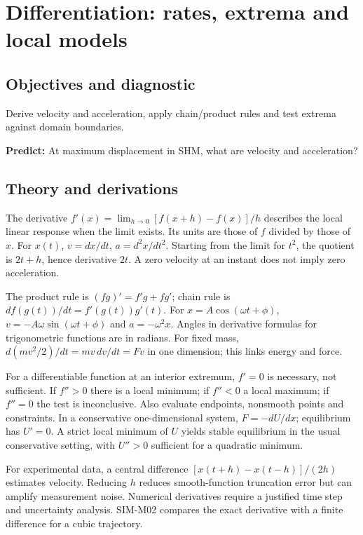 \documentclass[11pt,a4paper,openany]{book}
\begin{document}
\chapter{Differentiation: rates, extrema and local models}
\section{Objectives and diagnostic}
Derive velocity and acceleration, apply chain/product rules and test extrema against domain boundaries.

\textbf{Predict:} At maximum displacement in SHM, what are velocity and acceleration?
\section{Theory and derivations}
The derivative $f'(x)=\lim_{h\to0}[f(x+h)-f(x)]/h$ describes the local linear response when the limit exists. Its units are those of $f$ divided by those of $x$. For $x(t)$, $v=dx/dt$, $a=d^2x/dt^2$. Starting from the limit for $t^2$, the quotient is $2t+h$, hence derivative $2t$. A zero velocity at an instant does not imply zero acceleration.

The product rule is $(fg)'=f'g+fg'$; chain rule is $d f(g(t))/dt=f'(g(t))g'(t)$. For $x=A\cos(\omega t+\phi)$, $v=-A\omega\sin(\omega t+\phi)$ and $a=-\omega^2x$. Angles in derivative formulas for trigonometric functions are in radians. For fixed mass, $d(mv^2/2)/dt=mv\,dv/dt=Fv$ in one dimension; this links energy and force.

For a differentiable function at an interior extremum, $f'=0$ is necessary, not sufficient. If $f''>0$ there is a local minimum; if $f''<0$ a local maximum; if $f''=0$ the test is inconclusive. Also evaluate endpoints, nonsmooth points and constraints. In a conservative one-dimensional system, $F=-dU/dx$; equilibrium has $U'=0$. A strict local minimum of $U$ yields stable equilibrium in the usual conservative setting, with $U''>0$ sufficient for a quadratic minimum.

For experimental data, a central difference $[x(t+h)-x(t-h)]/(2h)$ estimates velocity. Reducing $h$ reduces smooth-function truncation error but can amplify measurement noise. Numerical derivatives require a justified time step and uncertainty analysis. SIM-M02 compares the exact derivative with a finite difference for a cubic trajectory.
\begin{center}
\end{center}
\end{document}
